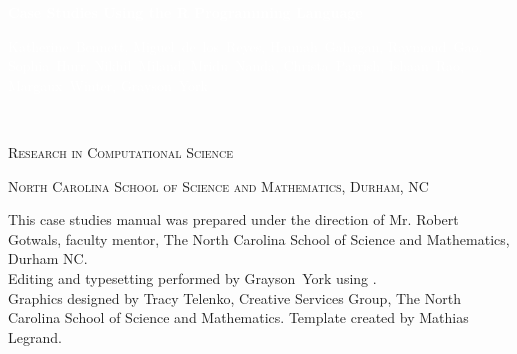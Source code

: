 \documentclass[11pt]{book} %
\begin{document}

\begingroup
\thispagestyle{empty}
\centering
\vspace*{5cm}
\par\normalfont\fontsize{35}{35}\sffamily\selectfont
\textbf{\textcolor{white}{Case Studies Using the R Programming Language}}\\
{\LARGE }\par %
\vspace*{1cm}
{\Large\textcolor{white}{ Katherine~Bennett, Miguel~de~los~Reyes, Hannah~Gahagan, Raymond~Gao, Sophia~Hurr, Nikhil~Miland, Mridu~Nanda, Christa~Parrish, Ishaan~Rao, Margaux~Winter, Grayson~York}}\par %
\endgroup


\newpage
~\vfill
\thispagestyle{empty}

\noindent \textsc{Research in Computational Science}\medskip

\noindent \textsc{North Carolina School of Science and Mathematics, Durham, NC}\medskip %

\noindent This case studies manual was prepared under the direction of Mr. Robert Gotwals, faculty mentor, The North Carolina School of Science and Mathematics, Durham NC.\\
Editing and typesetting performed by Grayson~York using \LaTeXe. \\
Graphics designed by Tracy Telenko, Creative Services Group, The North Carolina School of Science and Mathematics.
Template created by Mathias Legrand.\medskip   %
\end{document}
